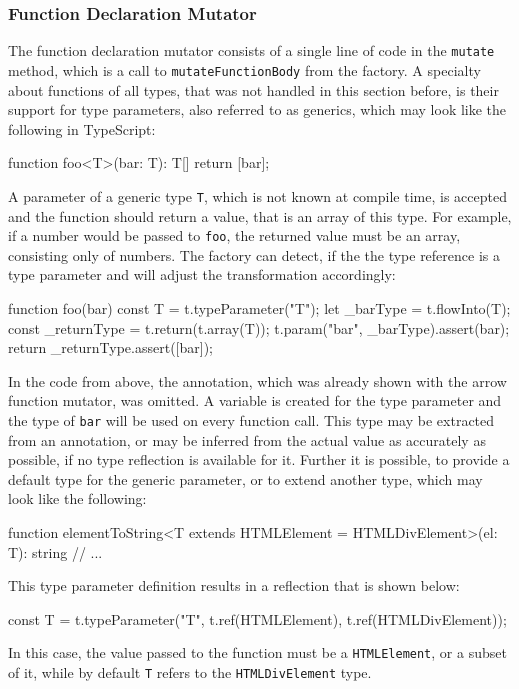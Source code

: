 \subsubsection{Function Declaration Mutator}
The function declaration mutator consists of a single line of code in the \texttt{mutate} method, which is a call to \texttt{mutateFunctionBody} from the factory. A specialty about functions of all types, that was not handled in this section before, is their support for type parameters, also referred to as generics, which may look like the following in TypeScript:
\begin{JsCode}[numbers=none]
function foo<T>(bar: T): T[] {
  return [bar];
}
\end{JsCode}
A parameter of a generic type \texttt{T}, which is not known at compile time, is accepted and the function should return a value, that is an array of this type. For example, if a number would be passed to \texttt{foo}, the returned value must be an array, consisting only of numbers. The factory can detect, if the the type reference is a type parameter and will adjust the transformation accordingly:
\begin{JsCode}[numbers=none]
function foo(bar) {
    const T = t.typeParameter("T");
    let _barType = t.flowInto(T);
    const _returnType = t.return(t.array(T));
    t.param("bar", _barType).assert(bar);
    return _returnType.assert([bar]);
}
\end{JsCode}
In the code from above, the annotation, which was already shown with the arrow function mutator, was omitted. A variable is created for the type parameter and the type of \texttt{bar} will be used on every function call. This type may be extracted from an annotation, or may be inferred from the actual value as accurately as possible, if no type reflection is available for it. Further it is possible, to provide a default type for the generic parameter, or to extend another type, which may look like the following:
\begin{JsCode}[numbers=none]
function elementToString<T extends HTMLElement = HTMLDivElement>(el: T): string {
  // ...
}
\end{JsCode}
This type parameter definition results in a reflection that is shown below:
\begin{JsCode}[numbers=none]
const T = t.typeParameter("T", t.ref(HTMLElement), t.ref(HTMLDivElement));
\end{JsCode}
In this case, the value passed to the function must be a \texttt{HTMLElement}, or a subset of it, while by default \texttt{T} refers to the \texttt{HTMLDivElement} type.

